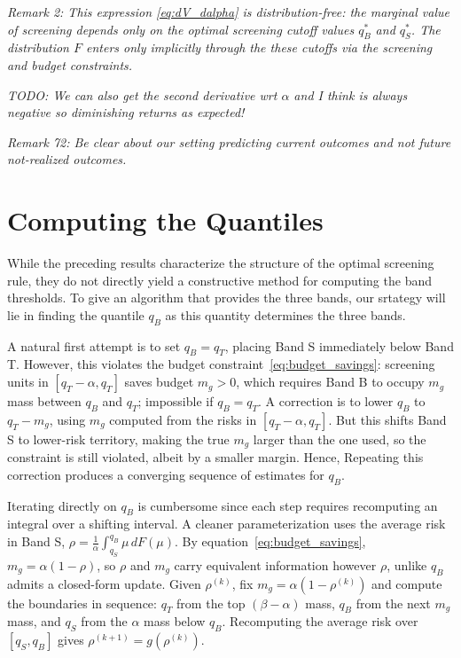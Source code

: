 
\textit{Remark 2: This expression \eqref{eq:dV_dalpha} is distribution-free: the marginal value of screening depends only on the optimal screening cutoff values $q_B^*$ and $q_S^*$.
The distribution $F$ enters only implicitly through the these cutoffs via the screening and budget constraints.}

\textit{TODO: We can also get the second derivative wrt $\alpha$ and I think is always negative so diminishing returns as expected!}

\textit{Remark 72: Be clear about our setting predicting current outcomes and not future not-realized outcomes.}


\section{Computing the Quantiles}
While the preceding results characterize the structure of the optimal screening rule, they do not directly yield a constructive method for computing the band thresholds. To give an algorithm that provides the three bands, our srtategy will lie in finding the quantile $q_B$ as this quantity determines the three bands.  

A natural first attempt is to set $q_B = q_T$, placing Band S immediately below Band T. However, this violates the budget constraint~\eqref{eq:budget_savings}: screening units in $[q_T-\alpha, q_T]$ saves budget $m_g > 0$, which requires Band B to occupy $m_g$ mass between $q_B$ and $q_T$; impossible if $q_B = q_T$. A correction is to lower $q_B$ to $q_T - m_g$, using $m_g$ computed from the risks in $[q_T - \alpha, q_T]$. But this shifts Band S to lower-risk territory, making the true $m_g$ larger than the one used, so the constraint is still violated, albeit by a smaller margin. Hence, Repeating this correction produces a converging sequence of estimates for $q_B$.

Iterating directly on $q_B$ is cumbersome since each step requires recomputing an integral over a shifting interval. A cleaner parameterization uses the average risk in Band S, $\rho = \frac{1}{\alpha}\int_{q_S}^{q_B}\mu\, dF(\mu)$. By equation~\eqref{eq:budget_savings}, $m_g = \alpha(1-\rho)$, so $\rho$ and $m_g$ carry equivalent information however $\rho$, unlike $q_B$ admits a closed-form update. Given $\rho^{(k)}$, fix $m_g = \alpha(1-\rho^{(k)})$ and compute the boundaries in sequence: $q_T$ from the top $(\beta-\alpha)$ mass, $q_B$ from the next $m_g$ mass, and $q_S$ from the $\alpha$ mass below $q_B$. Recomputing the average risk over $[q_S, q_B]$ gives $\rho^{(k+1)} = g(\rho^{(k)})$.

